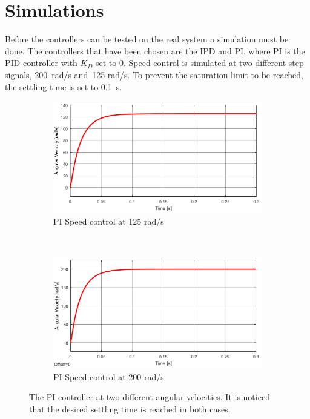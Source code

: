 \section{Simulations}
Before the controllers can be tested on the real system a simulation must be done. The controllers that have been chosen are the IPD and PI, where PI is the PID controller with $K_D$ set to 0. 
Speed control is simulated at two different step signals, 200~rad/s and~125 rad/s. 
To prevent the saturation limit to be reached, the settling time is set to 0.1~s.
\begin{figure}[h!]
	\centering
	\begin{subfigure}[b]{0.45\textwidth}
		\includegraphics[width=\textwidth]{graphics/PI_single125}
		\caption{PI Speed control at 125 rad/s}
		\label{fig:pisingle125}
	\end{subfigure}
	~ %
	\begin{subfigure}[b]{0.45\textwidth}
		\includegraphics[width=\textwidth]{graphics/PI_single200}
		\caption{PI Speed control at 200 rad/s}
		\label{fig:pisingle200}
	\end{subfigure}
	\caption{The PI controller at two different angular velocities. It is noticed that the desired settling time is reached in both cases.}\label{fig:pisingle}
\end{figure}






